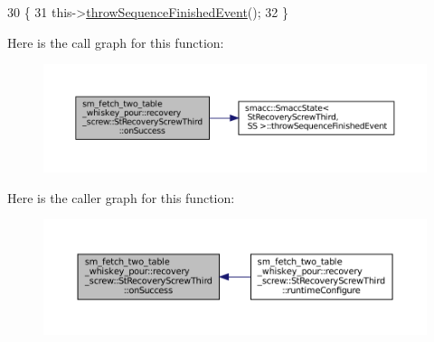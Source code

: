 \begin{DoxyCode}
30             \{
31                 this->\hyperlink{classsmacc_1_1SmaccState_a49dcfc25824f7e083dd4b999c49ab2b6}{throwSequenceFinishedEvent}();
32             \}
\end{DoxyCode}
Here is the call graph for this function\+:
\nopagebreak
\begin{figure}[H]
\begin{center}
\leavevmode
\includegraphics[width=350pt]{structsm__fetch__two__table__whiskey__pour_1_1recovery__screw_1_1StRecoveryScrewThird_ae13a2183d4fef921f6a62c4e9eda292c_cgraph}
\end{center}
\end{figure}
Here is the caller graph for this function\+:
\nopagebreak
\begin{figure}[H]
\begin{center}
\leavevmode
\includegraphics[width=350pt]{structsm__fetch__two__table__whiskey__pour_1_1recovery__screw_1_1StRecoveryScrewThird_ae13a2183d4fef921f6a62c4e9eda292c_icgraph}
\end{center}
\end{figure}
\mbox{\label{structsm__fetch__two__table__whiskey__pour_1_1recovery__screw_1_1StRecoveryScrewThird_a8ff310a47918d29c1e1e807f6c022c54}} 
